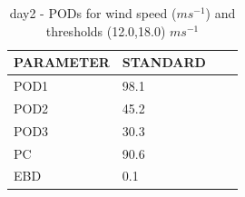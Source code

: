 \begin{table}[h!]
\begin{center}
\begin{tabular}{|l|l|l|l|}
\hline
\multicolumn{1}{|c|}{\cellcolor[HTML]{C0C0C0}\textbf{PARAMETER}} & \multicolumn{1}{c|}{\cellcolor[HTML]{C0C0C0}\textbf{STANDARD}} \\
\hline
\cellcolor[HTML]{C0C0C0}POD1  & 98.1   \\
\cellcolor[HTML]{C0C0C0}POD2  & 45.2   \\
\cellcolor[HTML]{C0C0C0}POD3  & 30.3   \\
\cellcolor[HTML]{C0C0C0}PC    & 90.6     \\
\cellcolor[HTML]{C0C0C0}EBD   & 0.1    \\
\hline
\end{tabular}
\caption{day2 - PODs for wind speed ($m s^{-1}$) and thresholds (12.0,18.0) $m s^{-1}$}
\label{tab:podwsFT:day2}
\end{center}
\end{table}
